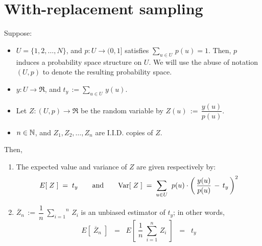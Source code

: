 

\section{With-replacement sampling}
\setcounter{theorem}{0}
\setcounter{equation}{0}


\renewcommand{\theenumi}{\roman{enumi}}
\renewcommand{\labelenumi}{\textnormal{(\theenumi)}$\;\;$}


\begin{theorem}
\mbox{}\vskip 0.2cm
\noindent
Suppose:
\begin{itemize}
\item
	$U = \{1,2,\ldots,N\}$,
	\;and\;
	$p : U \longrightarrow (0,1]$ \;satisfies\; $\underset{u \in U}{\sum}\,p(u) = 1$.
	\vskip 0.1cm
	Then, $p$ induces a probability space structure on $U$.
	We will use the abuse of notation $(U,p)$ to denote the resulting probability space.
\item
	$y : U \longrightarrow \Re$, \;and\; $t_{y} \,:= \underset{u \in U}{\sum}\,y(u)$.
\item
	Let $Z : (U,p) \longrightarrow \Re$ be the random variable by\;
	$Z(u) \,:=\, \dfrac{y(u)}{p(u)}$.
\item
	$n \in \mathbb{N}$, \;and\; $Z_{1}, Z_{2}, \ldots, Z_{n}$ are I.I.D. copies of $Z$.
\end{itemize}
Then,
\begin{enumerate}
\item
	The expected value and variance of $Z$ are given respectively by:
	\begin{equation*}
	E\!\left[\;Z\;\right] \;=\; t_{y}
	\quad\quad\textnormal{and}\quad\quad
	\textnormal{Var}\!\left[\;Z\;\right] \;=\; \underset{u \in U}{\sum}\;\; p(u)\cdot\left(\,\dfrac{y(u)}{p(u)}\,-\,t_{y}\,\right)^{2}
	\end{equation*}
\item
	$\overline{Z}_{n}\,:=\,\dfrac{1}{n}\;\overset{n}{\underset{i=1}{\sum}}\,Z_{i}$
	is an unbiased estimator of $t_{y}$;
	in other words,
	\begin{equation*}
	E\!\left[\;\overline{Z}_{n}\;\right]
	\;\; = \;\;
		E\!\left[\;\dfrac{1}{n}\;\overset{n}{\underset{i=1}{\sum}}\,Z_{i}\;\right]
	\;\; = \;\;
		t_{y}
	\end{equation*}

\end{enumerate}
\end{theorem}

